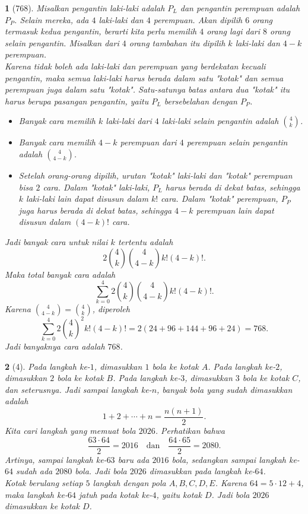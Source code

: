 \documentclass[11pt,a4paper,DIV=12]{scrartcl}
\theoremstyle{problemstyle}
\theoremstyle{answerstyle}
\newtheorem{answer}{}
\begin{document}
\begin{answer}[768]
  Misalkan pengantin laki-laki adalah $P_L$ dan pengantin perempuan adalah $P_P$. Selain mereka, ada $4$ laki-laki dan $4$ perempuan.
  Akan dipilih $6$ orang termasuk kedua pengantin, berarti kita perlu memilih $4$ orang lagi dari $8$ orang selain pengantin. Misalkan dari $4$ orang tambahan itu dipilih $k$ laki-laki dan $4-k$ perempuan.\\
  Karena tidak boleh ada laki-laki dan perempuan yang berdekatan kecuali pengantin, maka semua laki-laki harus berada dalam satu "kotak" dan semua perempuan juga dalam satu "kotak". Satu-satunya batas antara dua "kotak" itu harus berupa pasangan pengantin, yaitu $P_L$ bersebelahan dengan $P_P$.
  \begin{itemize}
    \item Banyak cara memilih $k$ laki-laki dari $4$ laki-laki selain pengantin adalah $\binom{4}{k}$.
    \item Banyak cara memilih $4-k$ perempuan dari $4$ perempuan selain pengantin adalah $\binom{4}{4-k}$.
    \item Setelah orang-orang dipilih, urutan "kotak" laki-laki dan "kotak" perempuan bisa $2$ cara. Dalam "kotak" laki-laki, $P_L$ harus berada di dekat batas, sehingga $k$ laki-laki lain dapat disusun dalam $k!$ cara. Dalam "kotak" perempuan, $P_P$ juga harus berada di dekat batas, sehingga $4-k$ perempuan lain dapat disusun dalam $(4-k)!$ cara.
  \end{itemize}

  Jadi banyak cara untuk nilai $k$ tertentu adalah
  \[
    2\binom{4}{k}\binom{4}{4-k}k!(4-k)!.
  \]
  Maka total banyak cara adalah
  \[
    \sum_{k=0}^{4}2\binom{4}{k}\binom{4}{4-k}k!(4-k)!.
  \]
  Karena $\binom{4}{4-k}=\binom{4}{k}$, diperoleh
  \[
    \sum_{k=0}^{4}2\binom{4}{k}^2k!(4-k)!
    =2(24+96+144+96+24)=768.
  \]
  Jadi banyaknya cara adalah $\boxed{768}$.
\end{answer}

\begin{answer}[4]
  Pada langkah ke-$1$, dimasukkan $1$ bola ke kotak $A$. Pada langkah ke-$2$, dimasukkan $2$ bola ke kotak $B$. Pada langkah ke-$3$, dimasukkan $3$ bola ke kotak $C$, dan seterusnya. Jadi sampai langkah ke-$n$, banyak bola yang sudah dimasukkan adalah
  \[
    1+2+\cdots+n=\frac{n(n+1)}{2}.
  \]
  Kita cari langkah yang memuat bola $2026$. Perhatikan bahwa
  \[
    \frac{63\cdot 64}{2}=2016
    \quad\text{dan}\quad
    \frac{64\cdot 65}{2}=2080.
  \]
  Artinya, sampai langkah ke-$63$ baru ada $2016$ bola, sedangkan sampai langkah ke-$64$ sudah ada $2080$ bola. Jadi bola $2026$ dimasukkan pada langkah ke-$64$.\\
  Kotak berulang setiap $5$ langkah dengan pola $A,B,C,D,E$. Karena $64=5\cdot 12+4$, maka langkah ke-$64$ jatuh pada kotak ke-$4$, yaitu kotak $D$. Jadi bola $2026$ dimasukkan ke kotak $\boxed{D}$.
\end{answer}
\end{document}
